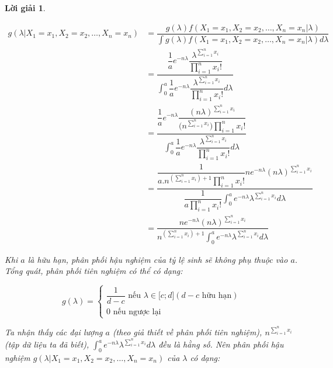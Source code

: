 \documentclass[14pt, a4paper]{article}
\theoremstyle{sltheorem}
\theoremstyle{soltheorem}
\newtheorem*{loigiai}{Lời giải}
\begin{document}
\begin{loigiai}
\begin{enumerate}
\begin{enumerate}[label=(\alph*)]
            \begin{equation*}
                \begin{aligned}
                    g(\lambda \vert X_1 =x_1, X_2=x_2, \dots, X_n=x_n) &= \dfrac{g(\lambda) f(X_1=x_1,X_2=x_2,\dots, X_n=x_n \vert \lambda)}{\int g(\lambda) f(X_1=x_1,X_2=x_2,\dots, X_n=x_n \vert \lambda) d \lambda} \\
                    &= \dfrac{\dfrac{1}{a} e^{-n\lambda} \dfrac{\lambda^{\sum_{i=1}^n x_i}}{\prod_{i=1}^n x_i!}}{\displaystyle\int_{0}^{a} \dfrac{1}{a} e^{-n\lambda} \dfrac{\lambda^{\sum_{i=1}^n x_i}}{\prod_{i=1}^n x_i!} d \lambda} \\
                    &= \dfrac{\dfrac{1}{a} e^{-n \lambda} \dfrac{(n\lambda)^{\sum_{i=1}^n x_i}}{\big(n^{\sum_{i=1}^n x_i}\big)\prod_{i=1}^n x_i!}}{\displaystyle\int_{0}^{a} \dfrac{1}{a} e^{-n\lambda} \dfrac{\lambda^{\sum_{i=1}^n x_i}}{\prod_{i=1}^n x_i!} d \lambda} \\
                    &= \dfrac{\dfrac{1}{a. n^{(\sum_{i=1}^n x_i) + 1}\prod_{i=1}^n x_i !}  ne^{-n\lambda} (n\lambda)^{\sum_{i=1}^n x_i}}{\dfrac{1}{a \prod_{i=1}^n x_i!} \displaystyle \int_{0}^a e^{-n\lambda}\lambda^{\sum_{i=1}^n x_i}d\lambda} \\
                    &= \dfrac{n e^{-n\lambda}(n\lambda)^{\sum_{i=1}^n x_i}}{n^{(\sum_{i=1}^n x_i) + 1}\displaystyle\int_{0}^a e^{-n\lambda} \lambda^{\sum_{i=1}^n x_i}d\lambda}
                \end{aligned}
            \end{equation*}

            Khi $a$ là hữu hạn, phân phối hậu nghiệm của tỷ lệ sinh sẽ không phụ thuộc vào $a$.
            Tổng quát, phân phối tiên nghiệm có thể có dạng:


            \begin{equation*}
                g(\lambda) = \begin{cases}
                    \dfrac{1}{d - c} \text{ nếu } \lambda \in \lbrack c; d\rbrack (d-c \text{ hữu hạn}) \\
                    0 \text{ nếu ngược lại}
                \end{cases}
            \end{equation*}

            Ta nhận thấy các đại lượng $a$ (theo giả thiết về phân phối tiên nghiệm), $n^{\sum_{i=1}^n x_i}$  (tập dữ liệu ta đã biết), $\displaystyle\int_{0}^a e^{-n\lambda} \lambda^{\sum_{i=1}^n x_i}d\lambda$ đều là hằng số.
            Nên phân phối hậu nghiệm $g(\lambda \vert X_1 =x_1, X_2=x_2, \dots, X_n=x_n)$ của $\lambda$ có dạng:


\end{enumerate}
\end{enumerate}
\end{loigiai}
\end{document}
